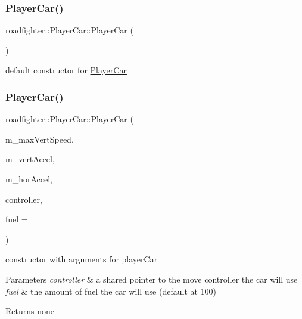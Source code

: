 \subsubsection{\texorpdfstring{Player\+Car()}{PlayerCar()}\hspace{0.1cm}{\footnotesize\ttfamily [1/5]}}
{\footnotesize\ttfamily roadfighter\+::\+Player\+Car\+::\+Player\+Car (\begin{DoxyParamCaption}{ }\end{DoxyParamCaption})\hspace{0.3cm}{\ttfamily [default]}}

default constructor for \hyperlink{classroadfighter_1_1PlayerCar}{Player\+Car} \mbox{\label{classroadfighter_1_1PlayerCar_a0e4db8cf7fc38214fa0383e1518ab2a2}} 
\subsubsection{\texorpdfstring{Player\+Car()}{PlayerCar()}\hspace{0.1cm}{\footnotesize\ttfamily [2/5]}}
{\footnotesize\ttfamily roadfighter\+::\+Player\+Car\+::\+Player\+Car (\begin{DoxyParamCaption}\item[{double}]{m\+\_\+max\+Vert\+Speed,  }\item[{double}]{m\+\_\+vert\+Accel,  }\item[{double}]{m\+\_\+hor\+Accel,  }\item[{std\+::shared\+\_\+ptr$<$ \hyperlink{classroadfighter_1_1InputController}{Input\+Controller} $>$}]{controller,  }\item[{int}]{fuel = {} }\end{DoxyParamCaption})}

constructor with arguments for player\+Car 
\begin{DoxyParams}{Parameters}
{\em controller} & a shared pointer to the move controller the car will use \\
\hline
{\em fuel} & the amount of fuel the car will use (default at 100) \\
\hline
\end{DoxyParams}
\begin{DoxyReturn}{Returns}
none 
\end{DoxyReturn}

